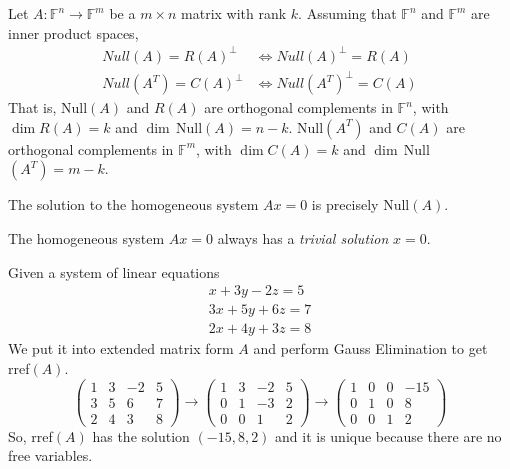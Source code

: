  \begin{theorem}
    Let $A: \mathbb{F}^n \longrightarrow \mathbb{F}^m$ be a $m \times n$ matrix with rank $k$. Assuming that $\mathbb{F}^n$ and $\mathbb{F}^m$ are inner product spaces,  
    \begin{align}
      Null(A) = R(A)^\perp &\iff Null(A)^\perp = R(A) \\
      Null(A^T) = C(A)^\perp &\iff Null(A^T)^\perp = C(A)
    \end{align}
    That is, Null$(A)$ and $R(A)$ are orthogonal complements in $\mathbb{F}^n$, with $\dim R(A) = k$ and $\dim\,$Null$(A) = n - k$. Null$(A^T)$ and $C(A)$ are orthogonal complements in $\mathbb{F}^m$, with $\dim C(A) = k$ and $\dim \,$Null$(A^T) = m - k$. 
  \end{theorem}

  \begin{corollary}
    The solution to the homogeneous system $A x = 0$ is precisely Null$(A)$. 
  \end{corollary}

  \begin{definition}
    The homogeneous system $A x = 0$ always has a \textit{trivial solution} $x = 0$. 
  \end{definition}

  \begin{example}
    Given a system of linear equations 
    \begin{align*}
      x + 3 y - 2z = 5 \\
      3 x + 5 y + 6 z = 7 \\
      2 x + 4 y + 3 z = 8
    \end{align*}
    We put it into extended matrix form $A$ and perform Gauss Elimination to get rref$(A)$. 
    \begin{equation}
      \begin{pmatrix}
      1 & 3&-2&5 \\ 3&5&6&7\\ 2&4&3&8
      \end{pmatrix} \rightarrow \begin{pmatrix}
      1&3&-2&5\\ 0&1&-3&2 \\ 0&0&1&2 \end{pmatrix} \rightarrow \begin{pmatrix}
      1&0&0&-15 \\ 0&1&0&8 \\ 0&0&1&2
      \end{pmatrix}
    \end{equation}
    So, rref$(A)$ has the solution $(-15, 8, 2)$ and it is unique because there are no free variables. 
  \end{example}

